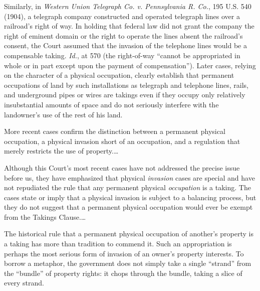Similarly, in \textit{Western Union Telegraph Co. v. Pennsylvania R. Co.}, 195
U.S. 540 (1904), a telegraph company constructed and operated telegraph lines
over a railroad's right of way. In holding that federal law did not grant the
company the right of eminent domain or the right to operate the lines absent the
railroad's consent, the Court assumed that the invasion of the telephone lines
would be a compensable taking. \textit{Id.}, at 570 (the right-of-way ``cannot
be appropriated in whole or in part except upon the payment of compensation'').
Later cases, relying on the character of a physical occupation, clearly
establish that permanent occupations of land by such installations as telegraph
and telephone lines, rails, and underground pipes or wires are takings even if
they occupy only relatively insubstantial amounts of space and do not seriously
interfere with the landowner's use of the rest of his land.

More recent cases confirm the distinction between a permanent physical
occupation, a physical invasion short of an occupation, and a regulation that
merely restricts the use of property.\ldots

Although this Court's most recent cases have not addressed the precise issue
before us, they have emphasized that physical \textit{invasion} cases are
special and have not repudiated the rule that any permanent physical
\textit{occupation} is a taking. The cases state or imply that a physical
invasion is subject to a balancing process, but they do not suggest that a
permanent physical occupation would ever be exempt from the Takings
Clause.\ldots



The historical rule that a permanent physical occupation of another's property
is a taking has more than tradition to commend it. Such an appropriation is
perhaps the most serious form of invasion of an owner's property interests. To
borrow a metaphor, the government does not simply take a single ``strand'' from
the ``bundle'' of property rights: it chops through the bundle, taking a slice
of every strand.

